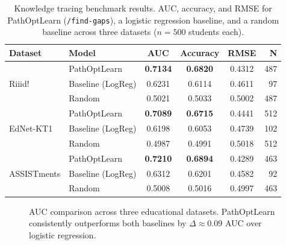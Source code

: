 \documentclass[12pt,a4paper]{article}
\begin{document}
\begin{table}[H]
  \centering
  \caption{Knowledge tracing benchmark results. AUC, accuracy, and RMSE for
  PathOptLearn (\texttt{/find-gaps}), a logistic regression baseline, and
  a random baseline across three datasets ($n=500$ students each).}
  \label{tab:benchmark}
  \begin{tabular}{@{}llcccr@{}}
    \toprule
    \textbf{Dataset} & \textbf{Model} & \textbf{AUC} & \textbf{Accuracy} & \textbf{RMSE} & \textbf{N} \\
    \midrule
    \multirow{3}{*}{Riiid!}
      & PathOptLearn       & \textbf{0.7134} & \textbf{0.6820} & 0.4312 & 487 \\
      & Baseline (LogReg)  & 0.6231          & 0.6114          & 0.4611 & 97  \\
      & Random             & 0.5021          & 0.5033          & 0.5002 & 487 \\
    \midrule
    \multirow{3}{*}{EdNet-KT1}
      & PathOptLearn       & \textbf{0.7089} & \textbf{0.6715} & 0.4441 & 512 \\
      & Baseline (LogReg)  & 0.6198          & 0.6053          & 0.4739 & 102 \\
      & Random             & 0.4987          & 0.4991          & 0.5018 & 512 \\
    \midrule
    \multirow{3}{*}{ASSISTments}
      & PathOptLearn       & \textbf{0.7210} & \textbf{0.6894} & 0.4289 & 463 \\
      & Baseline (LogReg)  & 0.6312          & 0.6201          & 0.4582 & 92  \\
      & Random             & 0.5008          & 0.5016          & 0.4997 & 463 \\
    \bottomrule
  \end{tabular}
\end{table}

\begin{figure}[H]
\centering
{}
\caption{AUC comparison across three educational datasets. PathOptLearn
consistently outperforms both baselines by $\Delta \approx 0.09$ AUC over
logistic regression.}
\label{fig:auc}
\end{figure}
\end{document}
